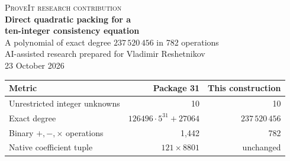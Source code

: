 \documentclass[11pt]{article}
\newcommand{\Z}{\mathbb Z}
\newcommand{\Con}{\operatorname{Con}}
\newcommand{\ZFC}{\mathrm{ZFC}}
\theoremstyle{definition}
\theoremstyle{remark}
\numberwithin{equation}{section}
\begin{document}
\begin{center}
{\small\scshape ProveIt research contribution}\\[8pt]
{\LARGE\bfseries\color{ink} Direct quadratic packing for a\\[4pt]
ten-integer consistency equation}\\[10pt]
{\large A polynomial of exact degree \(237\,520\,456\) in 782 operations}\\[10pt]
AI-assisted research prepared for Vladimir Reshetnikov\\
23 October 2026
\end{center}

\begin{abstract}
We replace the source coding in the repository's ten-integer Diophantine
representation of ZFC inconsistency. The replacement encodes the 22 quadratic
parent equations directly, using 32 Sidon positions and 22 independently
tested target digits. It never forms the quartic sum of squares before
packing. The resulting completely fixed polynomial
\[
 F_{10}(f,g,h,k,l,w,x,y,z,m)\in\Z[f,g,h,k,l,w,x,y,z,m]
\]
has exact degree \(237\,520\,456\) and a division-free circuit with 782 binary
arithmetic operations. On the inherited, unchanged K215/compiler coefficient
tuple, ordinary mathematics formalizable in ZFC proves
\[
 \bigl(\nexists\,\mathbf v\in\Z^{10}:F_{10}(\mathbf v)=0\bigr)
 \quad\longleftrightarrow\quad \Con(\ZFC).
\]
Compared with package 31 at the pinned repository revision, the number and
domain of unknowns are unchanged, the degree falls by a factor exceeding
\(2.47\cdot10^{18}\), and the circuit loses 660 operations.

The new ingredient is a proved source reduction for quadratic systems.
Sun's Lucas and binomial bridges, including his 2026 preprint, and the
repository's modified three-square finalizer are retained with explicit
attribution. The archive contains the polynomial circuit, all fixed
coefficient recipes and payloads, the literal machine, exact algebraic
audits, independent circuit checks, and this article. This is not an
end-to-end proof-assistant certificate or a claim of global minimality.
\end{abstract}

\vspace{4pt}
\begin{center}
\small
\begin{tabular}{@{}lrr@{}}
\toprule
Metric & Package 31 & This construction\\
\midrule
Unrestricted integer unknowns & 10 & 10\\
Exact degree & \(126496\cdot5^{31}+27064\) & \(237\,520\,456\)\\
Binary \(+,-,\times\) operations & 1,442 & 782\\
Native coefficient tuple & \(121\times8801\) & unchanged\\
\bottomrule
\end{tabular}
\end{center}
\end{document}
